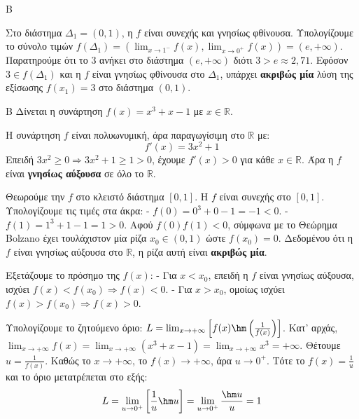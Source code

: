 \begin{thema}{Β}
\begin{erwthma}
\item Στο διάστημα $\Delta_1 = (0, 1)$, η $f$ είναι συνεχής και γνησίως φθίνουσα.
Υπολογίζουμε το σύνολο τιμών $f(\Delta_1) = \left( \lim_{x\to1^-} f(x), \lim_{x\to0^+} f(x) \right) = (e, +\infty)$.
Παρατηρούμε ότι το $3$ ανήκει στο διάστημα $(e, +\infty)$ διότι $3 > e \approx 2,71$.
Εφόσον $3 \in f(\Delta_1)$ και η $f$ είναι γνησίως φθίνουσα στο $\Delta_1$, υπάρχει \textbf{ακριβώς μία} λύση της εξίσωσης $f(x_1) = 3$ στο διάστημα $(0, 1)$.
\end{erwthma}
\end{thema}

\begin{thema}{Β}
Δίνεται η συνάρτηση $f(x) = x^3 + x - 1$ με $x \in \mathbb{R}$.
\begin{erwthma}
\item Η συνάρτηση $f$ είναι πολυωνυμική, άρα παραγωγίσιμη στο $\mathbb{R}$ με:
\[ f'(x) = 3x^2 + 1 \]
Επειδή $3x^2 \ge 0 \Rightarrow 3x^2+1 \ge 1 > 0$, έχουμε $f'(x) > 0$ για κάθε $x \in \mathbb{R}$.
Άρα η $f$ είναι \textbf{γνησίως αύξουσα} σε όλο το $\mathbb{R}$.

\item Θεωρούμε την $f$ στο κλειστό διάστημα $[0, 1]$.
Η $f$ είναι συνεχής στο $[0, 1]$.
Υπολογίζουμε τις τιμές στα άκρα:
- $f(0) = 0^3 + 0 - 1 = -1 < 0$.
- $f(1) = 1^3 + 1 - 1 = 1 > 0$.
Αφού $f(0)f(1) < 0$, σύμφωνα με το Θεώρημα Bolzano έχει τουλάχιστον μία ρίζα $x_0 \in (0, 1)$ ώστε $f(x_0)=0$.
Δεδομένου ότι η $f$ είναι γνησίως αύξουσα στο $\mathbb{R}$, η ρίζα αυτή είναι \textbf{ακριβώς μία}.

\item Εξετάζουμε το πρόσημο της $f(x)$:
- Για $x < x_0$, επειδή η $f$ είναι γνησίως αύξουσα, ισχύει $f(x) < f(x_0) \Rightarrow f(x) < 0$.
- Για $x > x_0$, ομοίως ισχύει $f(x) > f(x_0) \Rightarrow f(x) > 0$.

\item Υπολογίζουμε το ζητούμενο όριο: $L = \lim_{x\to+\infty} \left[ f(x) \hm \left( \frac{1}{f(x)} \right) \right]$.
Κατ' αρχάς, $\lim_{x\to+\infty} f(x) = \lim_{x\to+\infty} (x^3 + x - 1) = \lim_{x\to+\infty} x^3 = +\infty$.
Θέτουμε $u = \frac{1}{f(x)}$. Καθώς το $x \to +\infty$, το $f(x) \to +\infty$, άρα $u \to 0^+$.
Τότε το $f(x) = \frac{1}{u}$ και το όριο μετατρέπεται στο εξής:
\[ L = \lim_{u\to0^+} \left[ \frac{1}{u} \hm u \right] = \lim_{u\to0^+} \frac{\hm u}{u} = 1 \]
\end{erwthma}
\end{thema}

